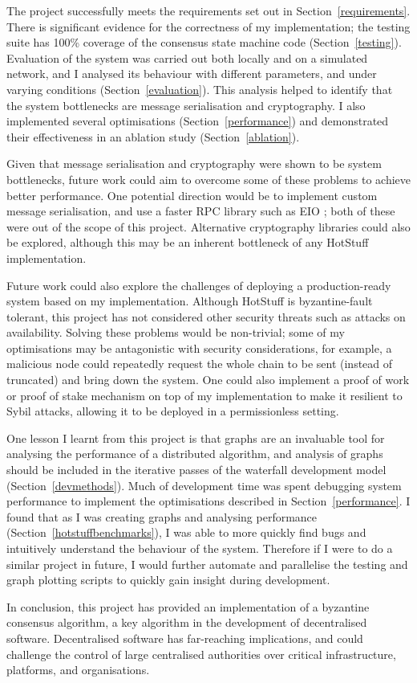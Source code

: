 The project successfully meets the requirements set out in Section~\ref{requirements}. There is significant evidence for the correctness of my implementation; the testing suite has 100\% coverage of the consensus state machine code (Section~\ref{testing}). Evaluation of the system was carried out both locally and on a simulated network, and I analysed its behaviour with different parameters, and under varying conditions (Section~\ref{evaluation}). This analysis helped to identify that the system bottlenecks are message serialisation and cryptography. I also implemented several optimisations (Section~\ref{performance}) and demonstrated their effectiveness in an ablation study (Section~\ref{ablation}).

Given that message serialisation and cryptography were shown to be system bottlenecks, future work could aim to overcome some of these problems to achieve better performance. One potential direction would be to implement custom message serialisation, and use a faster RPC library such as EIO \cite{eio}; both of these were out of the scope of this project. Alternative cryptography libraries could also be explored, although this may be an inherent bottleneck of any HotStuff implementation.

Future work could also explore the challenges of deploying a production-ready system based on my implementation. Although HotStuff is byzantine-fault tolerant, this project has not considered other security threats such as attacks on availability. Solving these problems would be non-trivial; some of my optimisations may be antagonistic with security considerations, for example, a malicious node could repeatedly request the whole chain to be sent (instead of truncated) and bring down the system. One could also implement a proof of work or proof of stake mechanism on top of my implementation to make it resilient to Sybil attacks, allowing it to be deployed in a permissionless setting.

One lesson I learnt from this project is that graphs are an invaluable tool for analysing the performance of a distributed algorithm, and analysis of graphs should be included in the iterative passes of the waterfall development model (Section~\ref{devmethods}). Much of development time was spent debugging system performance to implement the optimisations described in Section~\ref{performance}. I found that as I was creating graphs and analysing performance (Section~\ref{hotstuffbenchmarks}), I was able to more quickly find bugs and intuitively understand the behaviour of the system. Therefore if I were to do a similar project in future, I would further automate and parallelise the testing and graph plotting scripts to quickly gain insight during development.

In conclusion, this project has provided an implementation of a byzantine consensus algorithm, a key algorithm in the development of decentralised software. Decentralised software has far-reaching implications, and could challenge the control of large centralised authorities over critical infrastructure, platforms, and organisations.